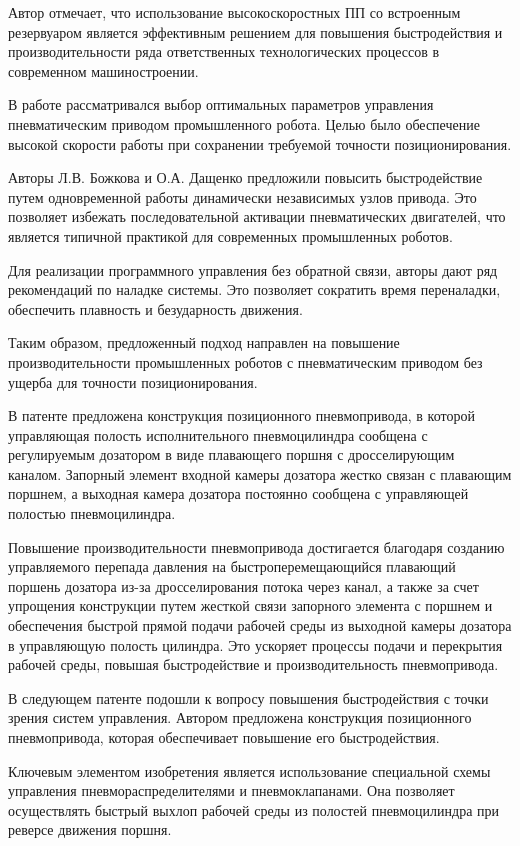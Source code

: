 Автор отмечает, что использование высокоскоростных
ПП со встроенным резервуаром является эффективным решением
для повышения быстродействия и производительности ряда ответственных
технологических процессов в современном машиностроении.

В работе \cite*{божкова:повышение_быстродействия} рассматривался выбор оптимальных параметров управления пневматическим приводом промышленного робота.
Целью было обеспечение высокой скорости работы при сохранении требуемой точности позиционирования.

Авторы Л.В. Божкова и О.А. Дащенко предложили повысить быстродействие путем одновременной работы
динамически независимых узлов привода. Это позволяет избежать последовательной активации пневматических двигателей,
что является типичной практикой для современных промышленных роботов.

Для реализации программного управления без обратной связи, авторы дают ряд рекомендаций по наладке системы.
Это позволяет сократить время переналадки, обеспечить плавность и безударность движения.

Таким образом, предложенный подход направлен на повышение производительности промышленных
роботов с пневматическим приводом без ущерба для точности позиционирования.


В патенте \cite*{патент:рязанов} предложена конструкция позиционного пневмопривода,
в которой управляющая полость исполнительного пневмоцилиндра сообщена с регулируемым
дозатором в виде плавающего поршня с дросселирующим каналом. Запорный элемент входной
камеры дозатора жестко связан с плавающим поршнем, а выходная камера дозатора постоянно
сообщена с управляющей полостью пневмоцилиндра.

Повышение производительности пневмопривода достигается благодаря созданию управляемого
перепада давления на быстроперемещающийся плавающий поршень дозатора из-за дросселирования
потока через канал, а также за счет упрощения конструкции путем жесткой связи запорного элемента
с поршнем и обеспечения быстрой прямой подачи рабочей среды из выходной камеры дозатора в
управляющую полость цилиндра. Это ускоряет процессы подачи и перекрытия рабочей среды, повышая
быстродействие и производительность пневмопривода.

В следующем патенте \cite*{патент:Кистиченко} подошли к вопросу повышения быстродействия с точки зрения систем управления.
Автором
предложена конструкция позиционного пневмопривода, которая обеспечивает повышение
его быстродействия.

Ключевым элементом изобретения является использование специальной схемы управления
пневмораспределителями и пневмоклапанами. Она позволяет осуществлять быстрый выхлоп
рабочей среды из полостей пневмоцилиндра при реверсе движения поршня.

